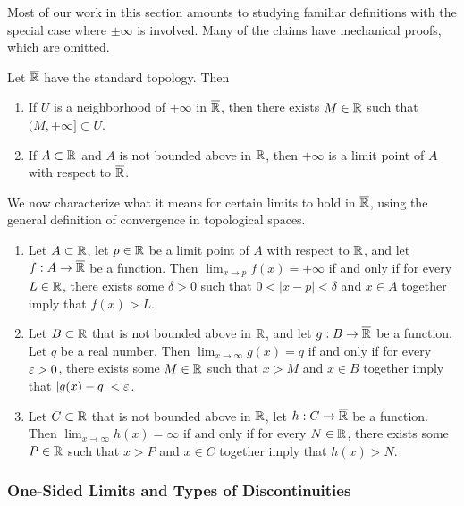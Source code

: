 \documentclass[12pt]{article} %
\begin{document}
Most of our work in this section amounts to studying familiar definitions with the special case where $\pm \infty$ is involved. Many of the claims have mechanical proofs, which are omitted.

\begin{proposition}
    Let $\overline{\mathbb{R}}$ have the standard topology. Then \begin{enumerate}
        \item If $U$ is a neighborhood of $+\infty$ in $\overline{\mathbb{R}}$, then there exists $M \in \mathbb{R}$ such that $(M, +\infty] \subset U$.
        \item If $A \subset \mathbb{R}$ and $A$ is not bounded above in $\mathbb{R}$, then $+\infty$ is a limit point of $A$ with respect to $\overline{\mathbb{R}}$.
    \end{enumerate}
\end{proposition}

We now characterize what it means for certain limits to hold in $\overline{\mathbb{R}}$, using the general definition of convergence in topological spaces.

\begin{proposition}
    \begin{enumerate}
        \item Let $A \subset \mathbb{R}$, let $p \in \mathbb{R}$ be a limit point of $A$ with respect to $\mathbb{R}$, and let $f : A \to \overline{\mathbb{R}}$ be a function. Then $\lim_{x \to p} f(x) = +\infty$ if and only if for every $L \in \mathbb{R}$, there exists some $\delta > 0$ such that $0 < |x-p| < \delta$ and $x \in A$ together imply that $f(x) > L$.
        \item Let $B \subset \mathbb{R}$ that is not bounded above in $\mathbb{R}$, and let $g : B \to \overline{\mathbb{R}}$ be a function. Let $q$ be a real number. Then $\lim_{x \to \infty} g(x) = q$ if and only if for every $\varepsilon > 0$, there exists some $M \in \mathbb{R}$ such that $x > M$ and $x \in B$ together imply that $|g(x) - q| < \varepsilon$.
        \item Let $C \subset \mathbb{R}$ that is not bounded above in $\mathbb{R}$, let $h : C \to \overline{\mathbb{R}}$ be a function. Then $\lim_{x \to \infty} h(x) = \infty$ if and only if for every $N \in \mathbb{R}$, there exists some $P \in \mathbb{R}$ such that $x > P$ and $x \in C$ together imply that $h(x) > N$.
    \end{enumerate}
\end{proposition}

\subsubsection{One-Sided Limits and Types of Discontinuities}
\end{document}
